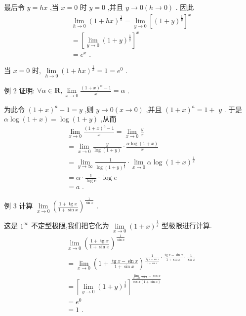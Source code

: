 最后令 $y = {hx}$ ,当 $x = 0$ 时 $y = 0$ ,并且 $y \rightarrow  0\left( {h \rightarrow  0}\right)$ . 因此
\begin{align*}
	&\mathop{\lim }\limits_{{h \rightarrow  0}}{\left( 1 + hx\right) }^{\frac{1}{h}} = \mathop{\lim }\limits_{{y \rightarrow  0}}{\left\lbrack  {\left( 1 + y\right) }^{\frac{1}{y}}\right\rbrack  }^{x}\\
	&= {\left\lbrack  \mathop{\lim }\limits_{{y \rightarrow  0}}{\left( 1 + y\right) }^{\frac{1}{y}}\right\rbrack  }^{x}\\
	&= {e}^{x}\text{ . }
\end{align*}

当 $x = 0$ 时, $\mathop{\lim }\limits_{{h \rightarrow  0}}{\left( 1 + hx\right) }^{\frac{1}{h}} = 1 = {e}^{0}$ .

例 2 证明: $\forall \alpha  \in  \mathbf{R},\mathop{\lim }\limits_{{x \rightarrow  0}}\frac{{\left( 1 + x\right) }^{\alpha } - 1}{x} = \alpha$ .

为此令 ${\left( 1 + x\right) }^{a} - 1 = y$ ,则 $y \rightarrow  0\left( {x \rightarrow  0}\right)$ ,并且 ${\left( 1 + x\right) }^{a} = 1 +$  $y$ . 于是 $\alpha \log \left( {1 + x}\right)  = \log \left( {1 + y}\right)$ ,从而
\begin{align*}
	&\mathop{\lim }\limits_{{x \rightarrow  0}}\frac{{\left( 1 + x\right) }^{a} - 1}{x} = \mathop{\lim }\limits_{{x \rightarrow  0}}\frac{y}{x}\\
	&= \mathop{\lim }\limits_{{x \rightarrow  0}}\frac{y}{\log \left( {1 + y}\right) } \cdot  \frac{\alpha \log \left( {1 + x}\right) }{x}\\
	&= \mathop{\lim }\limits_{{y \rightarrow  \infty }}\frac{1}{\log {\left( 1 + y\right) }^{\frac{1}{y}}} \cdot  \mathop{\lim }\limits_{{x \rightarrow  0}}\alpha \log {\left( 1 + x\right) }^{\frac{1}{x}}\\
	&= \alpha  \cdot  \frac{1}{\log e} \cdot  \log e\\
	&= a\text{ . }
\end{align*}

例 3 计算 $\mathop{\lim }\limits_{{x \rightarrow  0}}{\left( \frac{1 + \operatorname{tg}x}{1 + \sin x}\right) }^{\frac{1}{\sin x}}$ .

这是 ${1}^{\infty }$ 不定型极限,我们把它化为 $\mathop{\lim }\limits_{{x \rightarrow  0}}{\left( 1 + x\right) }^{\frac{1}{x}}$ 型极限进行计算.
\begin{align*}
	&\mathop{\lim }\limits_{{x \rightarrow  0}}{\left( \frac{1 + \operatorname{tg}x}{1 + \sin x}\right) }^{\frac{1}{\sin x}}\\
	&= \mathop{\lim }\limits_{{x \rightarrow  0}}{\left( 1 + \frac{\operatorname{tg}x - \sin x}{1 + \sin x}\right) }^{\frac{1}{\frac{\operatorname{tg}x - \sin x}{1 + \sin x}} \cdot  \frac{\operatorname{tg}x - \sin x}{1 + \sin x} \cdot  \frac{1}{\sin x}}\\
	&= {\left\lbrack  \mathop{\lim }\limits_{{y \rightarrow  0}}{\left( 1 + y\right) }^{\frac{1}{y}}\right\rbrack  }^{\frac{\mathop{\lim }\limits_{{x \rightarrow  0}}\frac{1}{\cos x} - \cos x}{\cos x\left( {1 + \sin x}\right) }}\\
	&= {e}^{0}\\
	&= 1\text{ . }
\end{align*}

